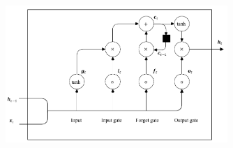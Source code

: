 \begin{figure}[!htbp]
  \centering
  \noindent\includegraphics[width=0.75\textwidth]{Img/chap2_ml/lstm_cell}
  \label{fig:ml_lstm_cell}
\end{figure}

